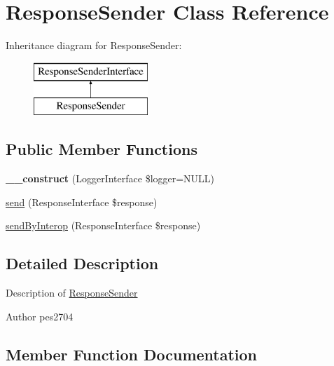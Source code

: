 \hypertarget{class_pes_1_1_http_1_1_response_sender}{}\section{Response\+Sender Class Reference}
\label{class_pes_1_1_http_1_1_response_sender}
Inheritance diagram for Response\+Sender\+:\begin{figure}[H]
\begin{center}
\leavevmode
\includegraphics[height=2.000000cm]{class_pes_1_1_http_1_1_response_sender}
\end{center}
\end{figure}
\subsection*{Public Member Functions}
\begin{DoxyCompactItemize}
\item 
\mbox{\label{class_pes_1_1_http_1_1_response_sender_a4d086b03f47931c183f0414bf2da5103}} 
{\bfseries \+\_\+\+\_\+construct} (Logger\+Interface \$logger=N\+U\+LL)
\item 
\mbox{\hyperlink{class_pes_1_1_http_1_1_response_sender_ac839c15946f979e4e1d19325d3b69ee0}{send}} (Response\+Interface \$response)
\item 
\mbox{\hyperlink{class_pes_1_1_http_1_1_response_sender_aefd3ad2cc7ad4a542aeda236f76b0e57}{send\+By\+Interop}} (Response\+Interface \$response)
\end{DoxyCompactItemize}


\subsection{Detailed Description}
Description of \mbox{\hyperlink{class_pes_1_1_http_1_1_response_sender}{Response\+Sender}}

\begin{DoxyAuthor}{Author}
pes2704 
\end{DoxyAuthor}


\subsection{Member Function Documentation}
\mbox{\label{class_pes_1_1_http_1_1_response_sender_ac839c15946f979e4e1d19325d3b69ee0}} 
